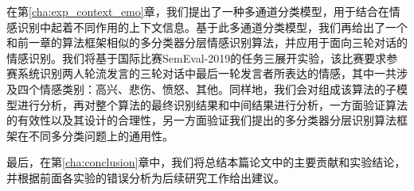 在第\ref{cha:exp_context_emo}章，我们提出了一种多通道分类模型，用于结合在情感识别中起着不同作用的上下文信息。基于此多通道分类模型，我们再给出了一个和前一章的算法框架相似的多分类器分层情感识别算法，并应用于面向三轮对话的情感识别。我们将基于国际比赛SemEval-2019的任务三\cite{SemEval2019Task3}展开实验，该比赛要求参赛系统识别两人轮流发言的三轮对话中最后一轮发言者所表达的情感，其中一共涉及四个情感类别：高兴、悲伤、愤怒、其他。同样地，我们会对组成该算法的子模型进行分析，再对整个算法的最终识别结果和中间结果进行分析，一方面验证算法的有效性以及其设计的合理性，另一方面验证我们提出的多分类器分层识别算法框架在不同多分类问题上的通用性。

最后，在第\ref{cha:conclusion}章中，我们将总结本篇论文中的主要贡献和实验结论，并根据前面各实验的错误分析为后续研究工作给出建议。













